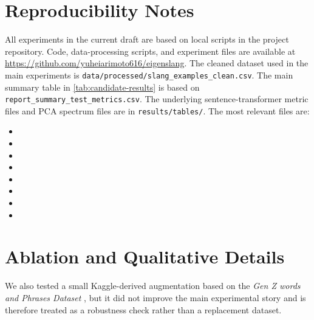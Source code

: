 \documentclass{article}
\begin{document}
\section{Reproducibility Notes}
All experiments in the current draft are based on local scripts in the project repository.
Code, data-processing scripts, and experiment files are available at \url{https://github.com/yuheiarimoto616/eigenslang}.
The cleaned dataset used in the main experiments is \texttt{data/processed/slang\_examples\_clean.csv}.
The main summary table in \cref{tab:candidate-results} is based on \texttt{report\_summary\_test\_metrics.csv}.
The underlying sentence-transformer metric files and PCA spectrum files are in \texttt{results/tables/}.
The most relevant files are:
\begin{itemize}
\item {}
\item {}
\item {}
\item {}
\item {}
\item {}
\item {}
\item {}
\end{itemize}

\section{Ablation and Qualitative Details}
We also tested a small Kaggle-derived augmentation based on the \emph{Gen Z words and Phrases Dataset} \citep{yeasmin2026kaggle}, but it did not improve the main experimental story and is therefore treated as a robustness check rather than a replacement dataset.
\end{document}
